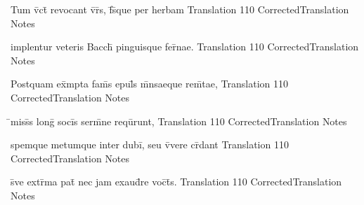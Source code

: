 \documentclass[]{book}
\begin{document}
\latline
  {Tum v\={\macron {\i}}ct\={} revocant v\={\macron {\i}}r\={\macron {\i}}s, f\={}s\={\macron {\i}}que per herbam}
  { Translation }
  {110}
  { CorrectedTranslation }
  { Notes }


\latline
  {implentur veteris Bacch\={\macron {\i}} pinguisque fer\={\macron {\i}}nae.}
  { Translation }
  {110}
  { CorrectedTranslation }
  { Notes }


\latline
  {Postquam ex\={}mpta fam\={}s epul\={\macron {\i}}s m\={}nsaeque rem\={}tae,}
  { Translation }
  {110}
  { CorrectedTranslation }
  { Notes }


\latline
  {\={}miss\={}s long\={} soci\={}s serm\={}ne requ\={\macron {\i}}runt,}
  { Translation }
  {110}
  { CorrectedTranslation }
  { Notes }


\latline
  {spemque metumque inter dubi\={\macron {\i}}, seu v\={\macron {\i}}vere cr\={}dant}
  { Translation }
  {110}
  { CorrectedTranslation }
  { Notes }


\latline
  {s\={\macron {\i}}ve extr\={}ma pat\={\macron {\i}} nec jam exaud\={\macron {\i}}re voc\={}t\={}s.}
  { Translation }
  {110}
  { CorrectedTranslation }
  { Notes }




\end{document}

